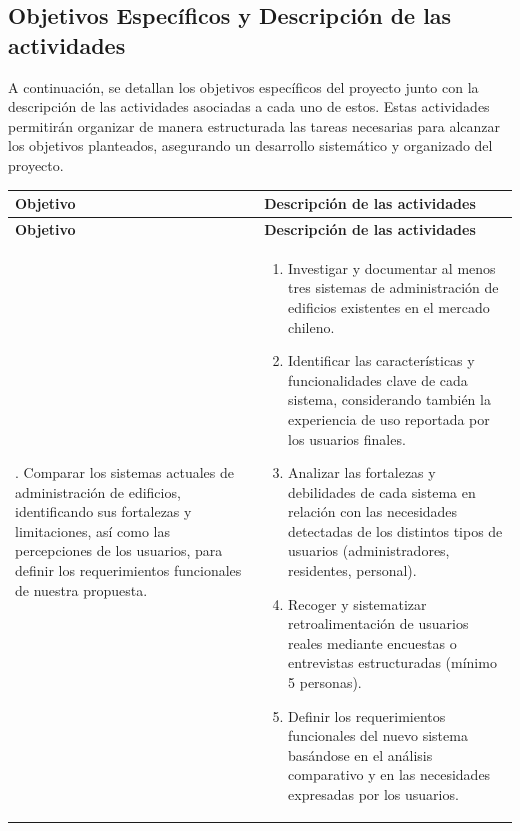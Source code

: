 \subsection{Objetivos Específicos y Descripción de las actividades}

A continuación, se detallan los objetivos específicos del proyecto junto con  la descripción de las actividades asociadas a cada uno de estos. Estas actividades permitirán organizar de manera estructurada las tareas necesarias para alcanzar los objetivos planteados, asegurando un desarrollo sistemático y organizado del proyecto.
\newpage
\begin{longtable}{|p{}|p{}|}
\hline
\textbf{Objetivo} & \textbf{Descripción de las actividades} \\
\hline
\endfirsthead

\hline
\textbf{Objetivo} & \textbf{Descripción de las actividades} \\
\hline
\endhead

\hline
\endfoot

\hline
1. Comparar los sistemas actuales de administración de edificios, identificando sus fortalezas y limitaciones, así como las percepciones de los usuarios, para definir los requerimientos funcionales de nuestra propuesta. &
\begin{enumerate}
    \item Investigar y documentar al menos tres sistemas de administración de edificios existentes en el mercado chileno.
    \item Identificar las características y funcionalidades clave de cada sistema, considerando también la experiencia de uso reportada por los usuarios finales.
    \item Analizar las fortalezas y debilidades de cada sistema en relación con las necesidades detectadas de los distintos tipos de usuarios (administradores, residentes, personal).
    \item Recoger y sistematizar retroalimentación de usuarios reales mediante encuestas o entrevistas estructuradas (mínimo 5 personas).
    \item Definir los requerimientos funcionales del nuevo sistema basándose en el análisis comparativo y en las necesidades expresadas por los usuarios.
\end{enumerate}
\\ \hline


\end{longtable}
